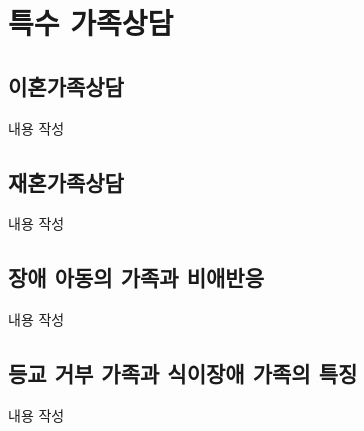 \section{특수 가족상담}

\subsection{이혼가족상담}
내용 작성

\subsection{재혼가족상담}
내용 작성

\subsection{장애 아동의 가족과 비애반응}
내용 작성

\subsection{등교 거부 가족과 식이장애 가족의 특징 }
내용 작성
